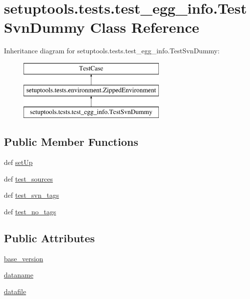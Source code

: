 \hypertarget{classsetuptools_1_1tests_1_1test__egg__info_1_1TestSvnDummy}{}\section{setuptools.\+tests.\+test\+\_\+egg\+\_\+info.\+Test\+Svn\+Dummy Class Reference}
\label{classsetuptools_1_1tests_1_1test__egg__info_1_1TestSvnDummy}
Inheritance diagram for setuptools.\+tests.\+test\+\_\+egg\+\_\+info.\+Test\+Svn\+Dummy\+:\begin{figure}[H]
\begin{center}
\leavevmode
\includegraphics[height=3.000000cm]{classsetuptools_1_1tests_1_1test__egg__info_1_1TestSvnDummy}
\end{center}
\end{figure}
\subsection*{Public Member Functions}
\begin{DoxyCompactItemize}
\item 
def \hyperlink{classsetuptools_1_1tests_1_1test__egg__info_1_1TestSvnDummy_a4716b4853c009507c4768e3427e88440}{set\+Up}
\item 
def \hyperlink{classsetuptools_1_1tests_1_1test__egg__info_1_1TestSvnDummy_a7e50614fba806a5f9febb039449e51b1}{test\+\_\+sources}
\item 
def \hyperlink{classsetuptools_1_1tests_1_1test__egg__info_1_1TestSvnDummy_abfb0a8cb8f83489be6053ea38877fe01}{test\+\_\+svn\+\_\+tags}
\item 
def \hyperlink{classsetuptools_1_1tests_1_1test__egg__info_1_1TestSvnDummy_a9c59e8b12c4335cb38798be2ac22a15e}{test\+\_\+no\+\_\+tags}
\end{DoxyCompactItemize}
\subsection*{Public Attributes}
\begin{DoxyCompactItemize}
\item 
\hyperlink{classsetuptools_1_1tests_1_1test__egg__info_1_1TestSvnDummy_a2f59d1e43fc116748c28bcf564098b46}{base\+\_\+version}
\item 
\hyperlink{classsetuptools_1_1tests_1_1test__egg__info_1_1TestSvnDummy_a09528b03ea5f267c9697f4e43770e13d}{dataname}
\item 
\hyperlink{classsetuptools_1_1tests_1_1test__egg__info_1_1TestSvnDummy_ab48d19e4661cfb140e463bf64197c0cc}{datafile}
\end{DoxyCompactItemize}
